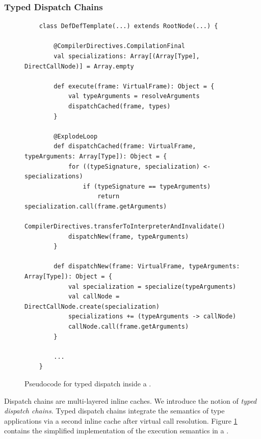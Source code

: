 \subsubsection*{Typed Dispatch Chains}

\begin{figure}[!htb]
	\begin{verbatim}
	class DefDefTemplate(...) extends RootNode(...) { 
			
		@CompilerDirectives.CompilationFinal
		val specializations: Array[(Array[Type], DirectCallNode)] = Array.empty
			
		def execute(frame: VirtualFrame): Object = {
			val typeArguments = resolveArguments
			dispatchCached(frame, types)
		}
			
		@ExplodeLoop
		def dispatchCached(frame: VirtualFrame, typeArguments: Array[Type]): Object = {
			for ((typeSignature, specialization) <- specializations)
				if (typeSignature == typeArguments)
					return specialization.call(frame.getArguments)
			CompilerDirectives.transferToInterpreterAndInvalidate()
			dispatchNew(frame, typeArguments)
		}
		
		def dispatchNew(frame: VirtualFrame, typeArguments: Array[Type]): Object = {
			val specialization = specialize(typeArguments)
			val callNode = DirectCallNode.create(specialization)
			specializations += (typeArguments -> callNode)
			callNode.call(frame.getArguments)
		}
		
		...
	}
	\end{verbatim}
	\caption{Pseudocode for typed dispatch inside a .}
	\label{impl:defdeftemplate-execute}
\end{figure}

Dispatch chains\cite{trufflyruby:specialization} are multi-layered inline caches.
We introduce the notion of \textit{typed dispatch chains}.
Typed dispatch chains integrate the semantics of type applications via a second inline cache after virtual call resolution.
Figure \ref{impl:defdeftemplate-execute} contains the simplified implementation of the execution semantics in a .

